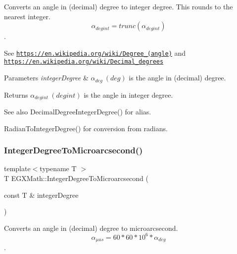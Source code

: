 Converts an angle in (decimal) degree to integer degree. This rounds to the nearest integer. \[\alpha_{deg int}=trunc(\alpha_{deg int})\]. 

See \href{https://en.wikipedia.org/wiki/Degree_(angle)}{\tt https\+://en.\+wikipedia.\+org/wiki/\+Degree\+\_\+(angle)} and \href{https://en.wikipedia.org/wiki/Decimal_degrees}{\tt https\+://en.\+wikipedia.\+org/wiki/\+Decimal\+\_\+degrees} 
\begin{DoxyParams}{Parameters}
{\em integer\+Degree} & $\alpha_{deg}\ (deg)$ is the angle in (decimal) degree. \\
\hline
\end{DoxyParams}
\begin{DoxyReturn}{Returns}
$\alpha_{deg int}\ (deg int)$ is the angle in integer degree. 
\end{DoxyReturn}
\begin{DoxySeeAlso}{See also}
Decimal\+Degree\+Integer\+Degree() for alias. 

Radian\+To\+Integer\+Degree() for conversion from radians. 
\end{DoxySeeAlso}
\mbox{\label{group___e_g_x_math-_angle_conversions-_integer_degree_ga69179d6082764595c7014805e1f6b31e}} 
\subsubsection{\texorpdfstring{Integer\+Degree\+To\+Microarcsecond()}{IntegerDegreeToMicroarcsecond()}}
{\footnotesize\ttfamily template$<$typename T $>$ \\
T E\+G\+X\+Math\+::\+Integer\+Degree\+To\+Microarcsecond (\begin{DoxyParamCaption}\item[{const T \&}]{integer\+Degree }\end{DoxyParamCaption})}



Converts an angle in (decimal) degree to microarcsecond. \[\alpha_{\mu as}=60 * 60 * 10^6 * \alpha_{deg}\]. 

